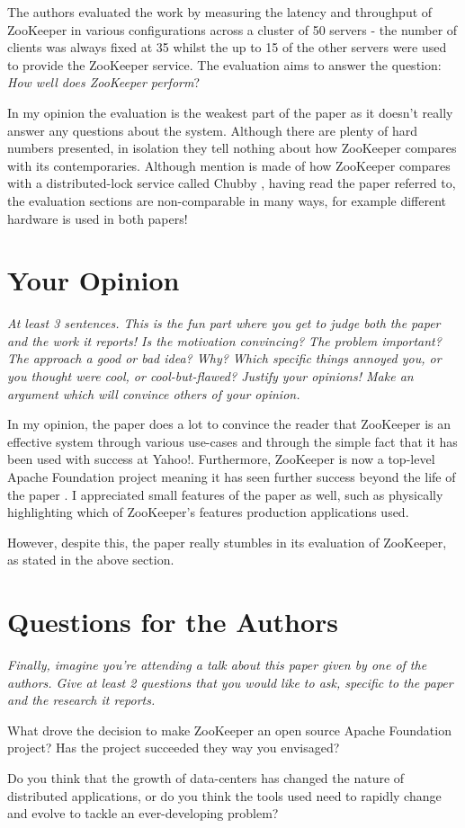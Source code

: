 \documentclass[11pt]{article}
\begin{document}
The authors evaluated the work by measuring the latency and throughput of
ZooKeeper in various configurations across a cluster of 50 servers - the number
of clients was always fixed at 35 whilst the up to 15 of the other servers were
used to provide the ZooKeeper service. The evaluation aims to answer the
question: \textit{How well does ZooKeeper perform}?

In my opinion the evaluation is the weakest part of the paper as it doesn't
really answer any questions about the system. Although there are plenty of hard
numbers presented, in isolation they tell nothing about how ZooKeeper compares
with its contemporaries. Although mention is made of how ZooKeeper compares
with a distributed-lock service called Chubby \cite{Chubby}, having read the
paper referred to, the evaluation sections are non-comparable in many ways, for
example different hardware is used in both papers!

\section*{Your Opinion}

\textsl{At least 3 sentences. This is the fun part where you get to judge both
the paper and the work it reports! Is the motivation convincing? The problem
important? The approach a good or bad idea? Why? Which specific things annoyed
you, or you thought were cool, or cool-but-flawed? Justify your opinions! Make
an argument which will convince others of your opinion.}

In my opinion, the paper does a lot to convince the reader that ZooKeeper is an
effective system through various use-cases and through the simple fact that it
has been used with success at Yahoo!. Furthermore, ZooKeeper is now a top-level
Apache Foundation project meaning it has seen further success beyond the life
of the paper \cite{ApacheZooKeeper}. I appreciated small features of the paper
as well, such as physically highlighting which of ZooKeeper's features
production applications used.

However, despite this, the paper really stumbles in its evaluation of
ZooKeeper, as stated in the above section.

\section*{Questions for the Authors}

\textsl{Finally, imagine you're attending a talk about this paper given by one
of the authors. Give at least 2 questions that you would like to ask, specific
to the paper and the research it reports.}

What drove the decision to make ZooKeeper an open source Apache Foundation
project? Has the project succeeded they way you envisaged?

Do you think that the growth of data-centers has changed the nature of
distributed applications, or do you think the tools used need to rapidly change
and evolve to tackle an ever-developing problem?




\end{document}
